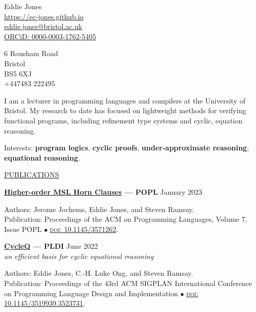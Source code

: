 \documentclass[10pt]{letter}
\renewcommand{\emph}[1]{\textit{#1}}
\begin{document}
\begin{minipage}[t]{0.7\textwidth}
  \raggedright{}
  {\huge Eddie Jones}
  \\[10pt]

  \href{https://ec-jones.github.io}{https://ec-jones.github.io}\\
  \href{mailto:eddie.jones@bristol.ac.uk}{eddie.jones@bristol.ac.uk} \\
  \href{https://orcid.org/0000-0003-1762-5405}{ORCiD: 0000-0003-1762-5405}
\end{minipage}
\begin{minipage}[t]{0.29\textwidth}
  \vfill 
  
  \raggedleft{}
  6 Rousham Road\\
  Bristol\\
  BS5 6XJ\\
  +447483 222495
\end{minipage}

\vspace{5pt}

I am a lecturer in programming languages and compilers at the University of Bristol.
My research to date has focused on lightweight methods for verifying functional programs, including refinement type systems and cyclic, equation reasoning.

Interests: \textbf{program logics}, \textbf{cyclic proofs}, \textbf{under-approximate reasoning}, \textbf{equational reasoning}.

\vspace{10pt}

\uline{{\large PUBLICATIONS}\hfill}

\vspace{5pt}

\textbf{\href{https://dl.acm.org/doi/abs/10.1145/3571262}{Higher-order MSL Horn Clauses} --- POPL} \hfill January 2023

Authors: Jerome Jochems, Eddie Jones, and Steven Ramsay.\\
Publication: Proceedings of the ACM on Programming Languages, Volume 7, Issue POPL \( \bullet \) \href{https://doi.org/10.1145/3571262}{\textsc{doi}: 10.1145/3571262}.

\vspace{10pt}

\textbf{\href{https://dl.acm.org/doi/10.1145/3519939.3523731}{CycleQ} --- PLDI} \hfill June 2022\\
\emph{an efficient basis for cyclic equational reasoning}

Authors: Eddie Jones, C.-H. Luke Ong, and Steven Ramsay.\\
Publication: Proceedings of the 43rd ACM SIGPLAN International Conference on Programming Language Design and Implementation \( \bullet \) \href{https://doi.org/10.1145/3519939.3523731}{\textsc{doi}: 10.1145/3519939.3523731}.
\end{document}
